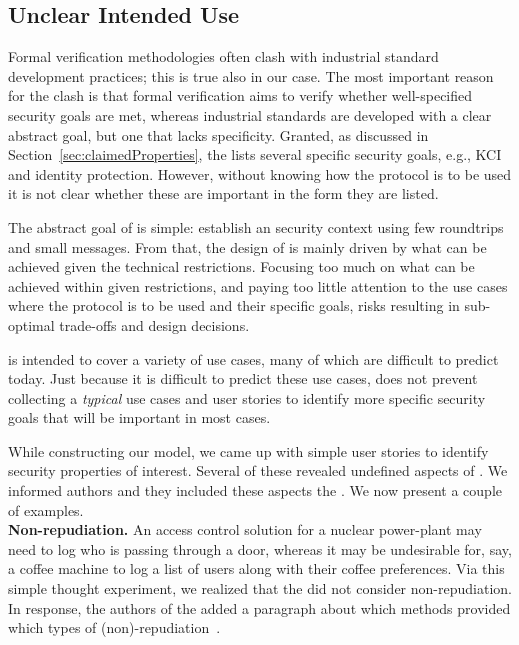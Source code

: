 \documentclass[runningheads, envcountsame, a4paper, draft, x11names]{llncs}
\newcommand{\runhead}[1]{\noindent\textbf{#1. }}
\begin{document}
\subsection{Unclear Intended Use}
\label{sec:unclearProtocolUse}
 
Formal verification methodologies often clash with industrial standard
development practices; this is true also in our case.
%
The most important reason for the clash is that formal verification aims to
verify whether well-specified security goals are met, whereas industrial
standards are developed with a clear abstract goal,
but one that lacks specificity.
%
Granted, as discussed in Section~\ref{sec:claimedProperties}, the \mSpec{} lists
several specific security goals, e.g., KCI and identity protection.
%
However, without knowing how the protocol is to be used
it is not clear whether these are important in the form they are listed.
%

The abstract goal of \mEdhoc{} is simple: establish an \mOscore{} security
context using few roundtrips and small messages.
%
From that, the design of \mEdhoc{} is mainly driven by what
can be achieved given the technical restrictions.
%
Focusing too much on what can be achieved within given restrictions, and paying
too little attention to the use cases where the
protocol is to be used and their specific goals, risks resulting in
sub-optimal trade-offs and design decisions.
%

\mEdhoc{} is intended to cover a variety of use cases, many of which are
difficult to predict today.
%
Just because it is difficult to predict these use cases, does not
prevent collecting a \emph{typical} use cases and user stories
to identify more specific security goals that will be important in most cases.
%

While constructing our model, we came up with simple user stories to identify
security properties of interest.
%
Several of these revealed undefined aspects of \mEdhoc{}.
%
We informed \mEdhoc{} authors and they included these aspects the \mSpec{}.
%
We now present a couple of examples.\\
%

 
\runhead{Non-repudiation}
An access control solution for a nuclear power-plant may need to log who is
passing through a door, whereas it may be undesirable for, say, a coffee
machine to log a list of users along with their coffee preferences.
%
Via this simple thought experiment, we realized that the \mSpec{} did not
consider non-repudiation.
%
In response, the authors of the \mSpec{} added a paragraph about which methods
provided which types of (non)-repudiation~\cite{personalCommunication}. \\
\end{document}
